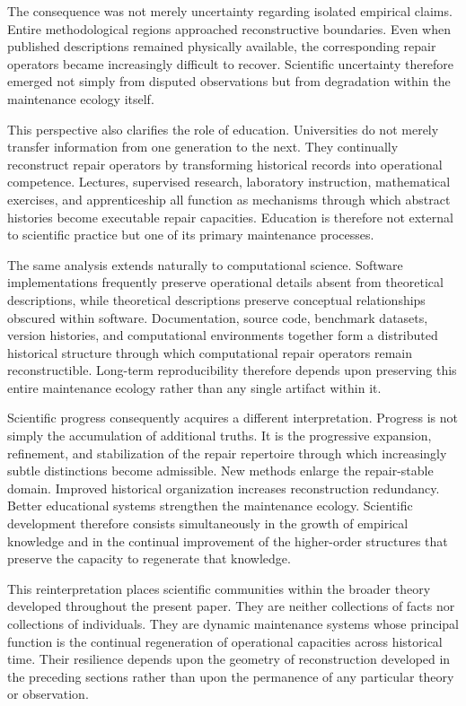 \documentclass[12pt,oneside]{article}
\theoremstyle{plain}
\theoremstyle{definition}
\theoremstyle{remark}
\theoremstyle{plain}
\begin{document}
The consequence was not merely uncertainty regarding isolated empirical claims. Entire
methodological regions approached reconstructive boundaries. Even when published descriptions
remained physically available, the corresponding repair operators became increasingly difficult to
recover. Scientific uncertainty therefore emerged not simply from disputed observations but from
degradation within the maintenance ecology itself.

This perspective also clarifies the role of education. Universities do not merely transfer
information from one generation to the next. They continually reconstruct repair operators by
transforming historical records into operational competence. Lectures, supervised research,
laboratory instruction, mathematical exercises, and apprenticeship all function as mechanisms
through which abstract histories become executable repair capacities. Education is therefore not
external to scientific practice but one of its primary maintenance processes.

The same analysis extends naturally to computational science. Software implementations frequently
preserve operational details absent from theoretical descriptions, while theoretical descriptions
preserve conceptual relationships obscured within software. Documentation, source code, benchmark
datasets, version histories, and computational environments together form a distributed historical
structure through which computational repair operators remain reconstructible. Long-term
reproducibility therefore depends upon preserving this entire maintenance ecology rather than any
single artifact within it.

Scientific progress consequently acquires a different interpretation. Progress is not simply the
accumulation of additional truths. It is the progressive expansion, refinement, and stabilization
of the repair repertoire through which increasingly subtle distinctions become admissible. New
methods enlarge the repair-stable domain. Improved historical organization increases reconstruction
redundancy. Better educational systems strengthen the maintenance ecology. Scientific development
therefore consists simultaneously in the growth of empirical knowledge and in the continual
improvement of the higher-order structures that preserve the capacity to regenerate that knowledge.

This reinterpretation places scientific communities within the broader theory developed throughout
the present paper. They are neither collections of facts nor collections of individuals. They are
dynamic maintenance systems whose principal function is the continual regeneration of operational
capacities across historical time. Their resilience depends upon the geometry of reconstruction
developed in the preceding sections rather than upon the permanence of any particular theory or
observation.
\end{document}
